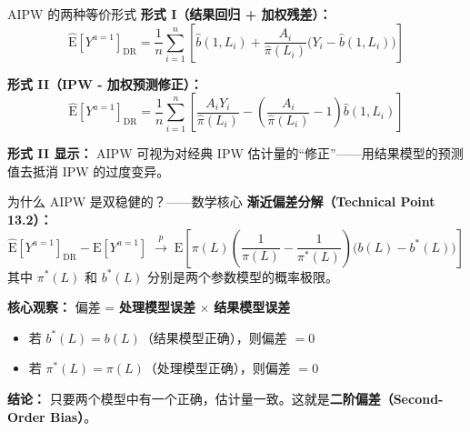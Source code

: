 \documentclass[aspectratio=169,10pt]{beamer}
\newcommand{\E}{\mathrm{E}}
\newcommand{\goto}{\xrightarrow{p}}
\begin{document}
	\begin{frame}{AIPW 的两种等价形式}
		\textbf{形式 I（结果回归 + 加权残差）：}
		\[
		\widehat{\E}[Y^{a=1}]_{\text{DR}} = \frac{1}{n}\sum_{i=1}^n \left[ \widehat{b}(1, L_i) + \frac{A_i}{\widehat{\pi}(L_i)}\big(Y_i - \widehat{b}(1, L_i)\big) \right]
		\]
		
		\textbf{形式 II（IPW - 加权预测修正）：}
		\[
		\widehat{\E}[Y^{a=1}]_{\text{DR}} = \frac{1}{n}\sum_{i=1}^n \left[ \frac{A_i Y_i}{\widehat{\pi}(L_i)} - \left(\frac{A_i}{\widehat{\pi}(L_i)} - 1\right)\widehat{b}(1, L_i) \right]
		\]
		
		\textbf{形式 II 显示：} AIPW 可视为对经典 IPW 估计量的“修正”——用结果模型的预测值去抵消 IPW 的过度变异。
	\end{frame}
	
	\begin{frame}{为什么 AIPW 是双稳健的？——数学核心}
		\textbf{渐近偏差分解（Technical Point 13.2）：}
		\[
		\widehat{\E}[Y^{a=1}]_{\text{DR}} - \E[Y^{a=1}] \;\goto\; \E\!\left[ \pi(L)\left(\frac{1}{\pi(L)} - \frac{1}{\pi^*(L)}\right)\big(b(L) - b^*(L)\big) \right]
		\]
		其中 $\pi^*(L)$ 和 $b^*(L)$ 分别是两个参数模型的概率极限。
		
		\vspace{0.3cm}
		\textbf{核心观察：} 偏差 = \textbf{处理模型误差} $\times$ \textbf{结果模型误差}
		
		\begin{itemize}
			\item 若 $b^*(L) = b(L)$（结果模型正确），则偏差 $= 0$
			\item 若 $\pi^*(L) = \pi(L)$（处理模型正确），则偏差 $= 0$
		\end{itemize}
		
		\textbf{结论：} 只要两个模型中有一个正确，估计量一致。这就是\textbf{二阶偏差（Second-Order Bias）}。
	\end{frame}
	
\end{document}
